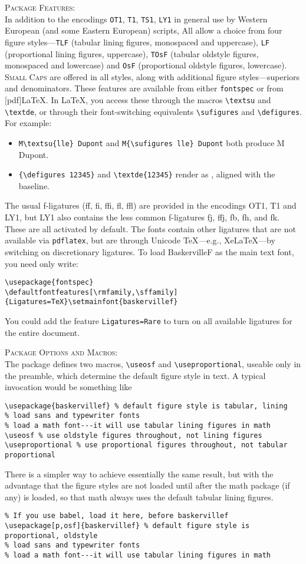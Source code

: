 \documentclass[11pt]{article}
\begin{document}
\textsc{Package Features:}\\
In addition to the encodings {\tt OT1}, {\tt T1}, {\tt TS1}, {\tt LY1} in general use by Western European (and some Eastern European) scripts,  All allow a choice from four figure styles---{\tt TLF} (tabular lining figures, monospaced and uppercase), {\tt LF} (proportional lining figures, uppercase), {\tt TOsF} (tabular oldstyle figures, monospaced and lowercase) and {\tt OsF} (proportional oldstyle figures, lowercase).  \textsc{Small Caps} are offered in all styles, along with additional figure styles---superiors and denominators. These features are available from either \verb|fontspec| or from [pdf]\LaTeX. In \LaTeX, you access these through the macros \verb|\textsu| and  \verb|\textde|, or through their font-switching equivalents \verb|\sufigures| and  \verb|\defigures|. For example:
\begin{itemize}
\item
\verb|M\textsu{lle} Dupont| and \verb|M{\sufigures lle} Dupont| both produce M Dupont.
\item  \verb|{\defigures 12345}| and \verb|\textde{12345}| render as , aligned with the baseline.
\end{itemize}
The usual f-ligatures (ff, fi, ffi, fl, ffl) are provided in the encodings OT1, T1 and LY1, but LY1 also contains the less common f-ligatures fj, ffj, fb, fh, and fk. These are all activated by default. The fonts contain other ligatures that are not available via {\tt pdflatex}, but are through Unicode TeX---e.g., XeLaTeX---by switching on discretionary ligatures. To load BaskervilleF as the main text font, you need only write:
\begin{verbatim}
\usepackage{fontspec}
\defaultfontfeatures[\rmfamily,\sffamily]{Ligatures=TeX}\setmainfont{baskervillef}
\end{verbatim}
You could add the feature {\tt Ligatures=Rare} to turn on all available ligatures for the entire document.

\textsc{Package Options and Macros:}\\
The package defines two macros, \verb|\useosf| and \verb|\useproportional|, useable only in the preamble, which determine the default figure style in text. A typical invocation would be something like
\begin{verbatim}
\usepackage{baskervillef} % default figure style is tabular, lining
% load sans and typewriter fonts
% load a math font---it will use tabular lining figures in math
\useosf % use oldstyle figures throughout, not lining figures
\useproportional % use proportional figures throughout, not tabular proportional
\end{verbatim}
There is a simpler way to achieve essentially the same result, but with the advantage that the figure styles are not loaded until after the math package (if any) is loaded, so that math always uses the default tabular lining figures. 
\begin{verbatim}
% If you use babel, load it here, before baskervillef
\usepackage[p,osf]{baskervillef} % default figure style is proportional, oldstyle
% load sans and typewriter fonts
% load a math font---it will use tabular lining figures in math
\end{verbatim}
\end{document}
